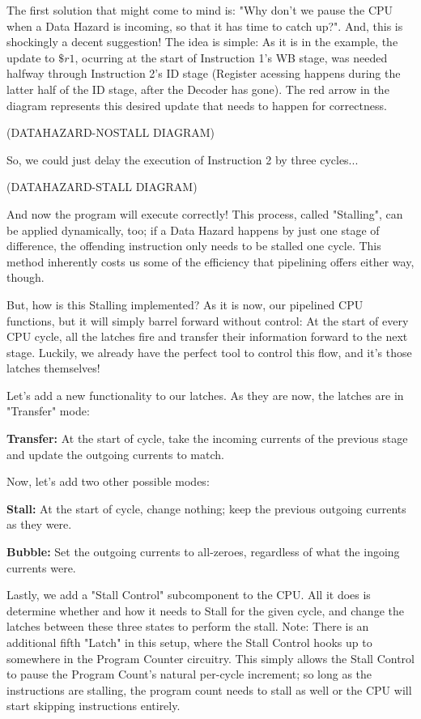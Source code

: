 \documentclass[12pt,twoside]{reedthesis}
\begin{document}
The first solution that might come to mind is: "Why don't we pause the CPU when a Data Hazard is incoming, so that it has time to catch up?". And, this is shockingly a decent suggestion! The idea is simple: As it is in the example, the update to $\$r1$, ocurring at the start of Instruction 1's WB stage, was needed halfway through Instruction 2's ID stage (Register acessing happens during the latter half of the ID stage, after the Decoder has gone). The red arrow in the diagram represents this desired update that needs to happen for correctness.

(DATAHAZARD-NOSTALL DIAGRAM)

So, we could just delay the execution of Instruction 2 by three cycles...

(DATAHAZARD-STALL DIAGRAM)

And now the program will execute correctly! This process, called "Stalling", can be applied dynamically, too; if a Data Hazard happens by just one stage of difference, the offending instruction only needs to be stalled one cycle. This method inherently costs us some of the efficiency that pipelining offers either way, though.

But, how is this Stalling implemented? As it is now, our pipelined CPU functions, but it will simply barrel forward without control: At the start of every CPU cycle, all the latches fire and transfer their information forward to the next stage. Luckily, we already have the perfect tool to control this flow, and it's those latches themselves!

Let's add a new functionality to our latches. As they are now, the latches are in "Transfer" mode:

\qquad \textbf{Transfer:} At the start of cycle, take the incoming currents of the previous stage and update the outgoing currents to match.

Now, let's add two other possible modes:

\qquad \textbf{Stall:} At the start of cycle, change nothing; keep the previous outgoing currents as they were.

\qquad \textbf{Bubble:} Set the outgoing currents to all-zeroes, regardless of what the ingoing currents were.

Lastly, we add a "Stall Control" subcomponent to the CPU. All it does is determine whether and how it needs to Stall for the given cycle, and  change the latches between these three states to perform the stall. Note: There is an additional fifth "Latch" in this setup, where the Stall Control hooks up to somewhere in the Program Counter circuitry. This simply allows the Stall Control to pause the Program Count's natural per-cycle increment; so long as the instructions are stalling, the program count needs to stall as well or the CPU will start skipping instructions entirely.
\end{document}
